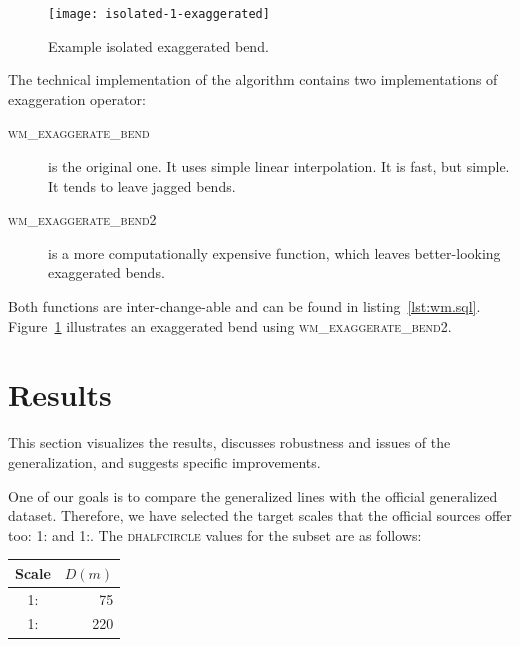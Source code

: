 \documentclass[a4paper]{article}
\begin{document}
\begin{figure}[ht]
    \centering
    \texttt{[image: isolated-1-exaggerated]}
    \caption{Example isolated exaggerated bend.}
    \label{fig:isolated-1-exaggerated}
\end{figure}

The technical implementation of the algorithm contains two implementations
of exaggeration operator:

\begin{description}

    \item[\normalfont\textsc{wm\_exaggerate\_bend}] is the original one. It
        uses simple linear interpolation. It is fast, but simple. It tends to
        leave jagged bends.

    \item[\normalfont\textsc{wm\_exaggerate\_bend2}] is a more computationally
        expensive function, which leaves better-looking exaggerated bends.

\end{description}

Both functions are inter-change-able and can be found in listing~\ref{lst:wm.sql}.
Figure~\ref{fig:isolated-1-exaggerated} illustrates an exaggerated bend using
\textsc{wm\_exaggerate\_bend2}.

\section{Results}
\label{sec:results}

This section visualizes the results, discusses robustness and issues of the
generalization, and suggests specific improvements.

One of our goals is to compare the generalized lines with the official
generalized dataset\cite{nzt}. Therefore, we have selected the target scales
that the official sources offer too: 1: and
1:. The \textsc{dhalfcircle} values for the subset are as
follows:

\begin{table}[ht]
    \centering
    \begin{tabular}{ c  D{.}{.}{1} }
        Scale               &   \\ :  &  75                         \\
        1: & 220                         \\
    \end{tabular}
\end{table}
\end{document}
